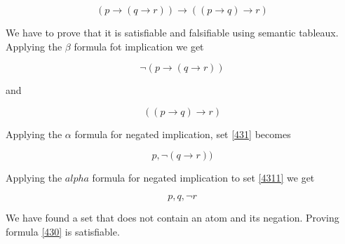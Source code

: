 \documentclass[10pt,a4paper]{article}
\begin{document}
\begin{equation}
\label{430}
(p \rightarrow (q \rightarrow r)) \rightarrow ((p \rightarrow q)  \rightarrow r)
\end{equation}

We have to prove that it is satisfiable and falsifiable using semantic tableaux. Applying the $\beta$ formula fot implication we get

\begin{equation}
\label{431}
 \neg (p \rightarrow (q \rightarrow r)) 
\end{equation}

and

\begin{equation}
 \label{432}
 ((p \rightarrow q)  \rightarrow r)
\end{equation}

Applying the $\alpha$ formula for negated implication, set \ref{431} becomes


\begin{equation}
\label{4311}
p, \neg (q \rightarrow r)) 
\end{equation}

Applying the $alpha$ formula for negated implication to set \ref{4311} we get

\begin{equation}
\label{4311}
p,q,\neg r
\end{equation}

We have found a set that does not contain an atom and its negation. Proving formula \ref{430} is satisfiable.
\end{document}

